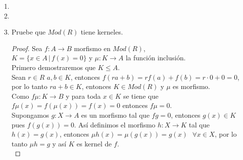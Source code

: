 \documentclass{article}
\begin{document}
\begin{enumerate}[label=\textbf{Ej \arabic*.}]
\begin{proof}
conmuta, entonces por propiedades de las imagenes, existen \\
$\mu:\catarrow{}{Im(f\beta_1)}{B}{m}$ y $f':f^{-1}(B_1)\to Im(f\beta_1)$ tales que el siguiente diagrama\\

\centerline{
}

es un diagrama conmutativo, por lo que existe un único \\$g':Im(f\beta_1)\to B_1$, tal que $\nu_2\nu_1 g'=\mu$\,\, y \,\,$gf'=\beta_2$ dado por la\\
propiedad universal de las imagenes. Mas aún, notemos que $g'$ es mono, pues $\mu$ es mono y $\mu=\nu_2\nu_1g'$. 
Así  $f\beta_1=\nu_2\nu_1\beta_2$. \\
Por lo que $Im(f\beta_1)=f(f^{-1}(B_1))\subseteq B_1.$


\end{proof}



\item

\item

\item Pruebe que $Mod(R)$ tiene kerneles.

\begin{proof}

Sea $f:A\to B$ morfismo en $Mod(R)$,\,\, \\$K=\{x\in A\,|\,f(x)=0\}$ y $\mu:K\to A$ la función inclusión.\\

Primero demostraremos que $K\leq A$. \\

Sean $r\in R$ $a,b\in K$, entonces $f(ra+b)=rf(a)+f(b)=r\cdot 0+0=0$, por lo tanto $ra+b\in K$, entonces $K\in Mod(R)$ y $\mu$ es morfismo.\\

 Como $f\mu:K\to B$ y para toda $x\in K$ se tiene que $f\mu(x)=f(\mu(x))=f(x)=0$ entonces $f\mu=0$.\\

 Supongamos $g:X\to A$ es un morfismo tal que $fg=0$, entonces $g(x)\in K$ pues $f(g(x))=0$. Así
definimos el morfismo $h:X\to K$ tal que $h(x)=g(x)$, entonces $\mu h(x)=\mu(g(x))=g(x)$ \,\,$\forall x\in X$, por lo tanto $\mu h=g$ y así $K$ es
kernel de $f$.\\


\end{proof}
\end{enumerate}
\end{document}
